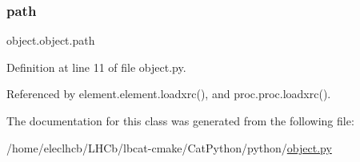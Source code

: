 \subsubsection{\texorpdfstring{path}{path}}
{\footnotesize\ttfamily object.\+object.\+path}



Definition at line 11 of file object.\+py.



Referenced by element.\+element.\+loadxrc(), and proc.\+proc.\+loadxrc().



The documentation for this class was generated from the following file\+:\begin{DoxyCompactItemize}
\item 
/home/eleclhcb/\+L\+H\+Cb/lbcat-\/cmake/\+Cat\+Python/python/\hyperlink{object_8py}{object.\+py}\end{DoxyCompactItemize}
